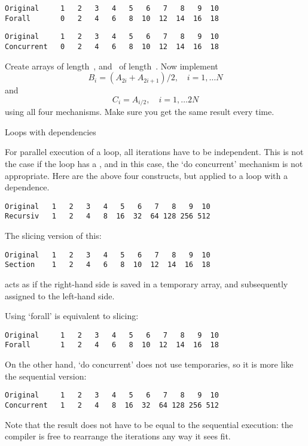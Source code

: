 \begin{verbatim}
Original     1   2   3   4   5   6   7   8   9  10
Forall       0   2   4   6   8  10  12  14  16  18
\end{verbatim}

\begin{verbatim}
Original     1   2   3   4   5   6   7   8   9  10
Concurrent   0   2   4   6   8  10  12  14  16  18
\end{verbatim}

\begin{exercise}
  Create arrays  of length~, and ~of length~.
  Now implement
  \[ B_i = (A_{2i}+A_{2i+1})/2,\quad i=1,\ldots N \]
  and
  \[ C_i = A_{i/2},\quad i=1,\ldots 2N \]
  using all four mechanisms. Make sure you get the same result every time.
\end{exercise}

 {Loops with dependencies}

For parallel execution of a loop, all iterations have to be independent.
This is not the case if the loop has a , and in
this case, the `do concurrent' mechanism is not appropriate.
%
Here are the above four constructs, but applied to a loop with a dependence.
%
%
\begin{verbatim}
Original   1   2   3   4   5   6   7   8   9  10
Recursiv   1   2   4   8  16  32  64 128 256 512
\end{verbatim}

The slicing version of this:
%
%
\begin{verbatim}
Original   1   2   3   4   5   6   7   8   9  10
Section    1   2   4   6   8  10  12  14  16  18
\end{verbatim}
%
acts as if the right-hand side is saved in a temporary array, and
subsequently assigned to the left-hand side.

Using `forall' is equivalent to slicing:
%
%
\begin{verbatim}
Original     1   2   3   4   5   6   7   8   9  10
Forall       1   2   4   6   8  10  12  14  16  18
\end{verbatim}

On the other hand, `do concurrent' does not use temporaries, so it is
more like the sequential version:
%
%
\begin{verbatim}
Original     1   2   3   4   5   6   7   8   9  10
Concurrent   1   2   4   8  16  32  64 128 256 512
\end{verbatim}
Note that the result does not have to be equal to the sequential
execution: the compiler is free to rearrange the iterations any way it
sees fit.

